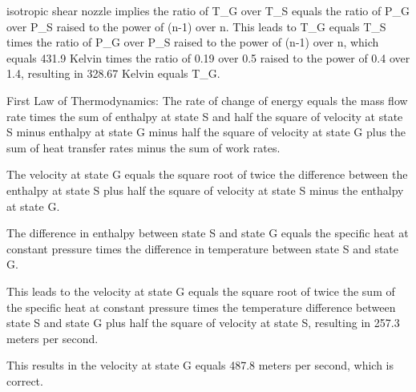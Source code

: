 isotropic shear nozzle implies the ratio of T_G over T_S equals the ratio of P_G over P_S raised to the power of (n-1) over n. This leads to T_G equals T_S times the ratio of P_G over P_S raised to the power of (n-1) over n, which equals 431.9 Kelvin times the ratio of 0.19 over 0.5 raised to the power of 0.4 over 1.4, resulting in 328.67 Kelvin equals T_G.

First Law of Thermodynamics: The rate of change of energy equals the mass flow rate times the sum of enthalpy at state S and half the square of velocity at state S minus enthalpy at state G minus half the square of velocity at state G plus the sum of heat transfer rates minus the sum of work rates.

The velocity at state G equals the square root of twice the difference between the enthalpy at state S plus half the square of velocity at state S minus the enthalpy at state G.

The difference in enthalpy between state S and state G equals the specific heat at constant pressure times the difference in temperature between state S and state G.

This leads to the velocity at state G equals the square root of twice the sum of the specific heat at constant pressure times the temperature difference between state S and state G plus half the square of velocity at state S, resulting in 257.3 meters per second.

This results in the velocity at state G equals 487.8 meters per second, which is correct.